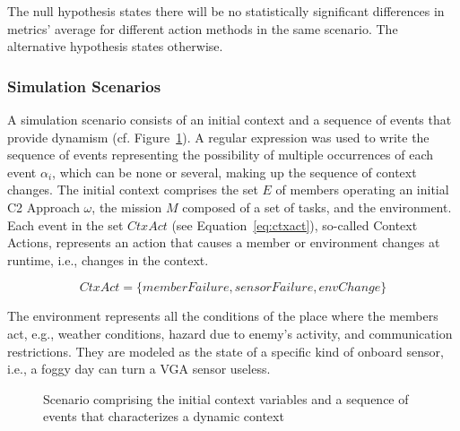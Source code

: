 

The null hypothesis states there will be no statistically significant differences in metrics' average for different action methods in the same scenario. The alternative hypothesis states otherwise. %


\subsubsection{Simulation Scenarios}
\label{sssec:scenarios}

A simulation scenario consists of an initial context and a sequence of events that provide dynamism (cf. Figure~\ref{fig:scenario}). A regular expression was used to write the sequence of events representing the possibility of multiple occurrences of each event $\alpha_i$, which can be none or several, making up the sequence of context changes. The initial context comprises the set $E$ of members operating an initial C2 Approach $\omega$, the mission $M$ composed of a set of tasks, and the environment. Each event in the set $CtxAct$ (see Equation~\ref{eq:ctxact}), so-called Context Actions, represents an action that causes a member or environment changes at runtime, i.e., changes in the context. 

\begin{equation}
    \label{eq:ctxact}
    CtxAct = \{memberFailure,sensorFailure, envChange \} 
\end{equation}

The environment represents all the conditions of the place where the members act, e.g., weather conditions, hazard due to enemy's activity, and communication restrictions. They are modeled as the state of a specific kind of onboard sensor, i.e., a foggy day can turn a VGA sensor useless.

\begin{figure}[ht!]
    \centering
    \scalebox{.5}{}
    \caption{Scenario comprising the initial context variables and a sequence of events that characterizes a dynamic context}
    \label{fig:scenario}
\end{figure}

